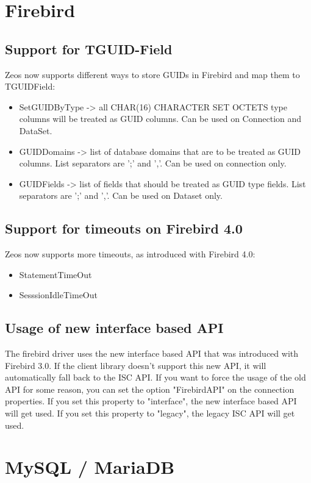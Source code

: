\documentclass[a4paper,12pt,oneside]{article}
\begin{document}
\section{Firebird}

\subsection{Support for TGUID-Field}
Zeos now supports different ways to store GUIDs in Firebird and map them to TGUIDField:
\begin{itemize}
  \item SetGUIDByType -> all CHAR(16) CHARACTER SET OCTETS type columns will be treated as GUID columns. Can be used on Connection and DataSet.
  \item GUIDDomains -> list of database domains that are to be treated as GUID columns. List separators are ';' and ','. Can be used on connection only.
  \item GUIDFields -> list of fields that should be treated as GUID type fields. List separators are ';' and ','. Can be used on Dataset only.
\end{itemize}

\subsection{Support for timeouts on Firebird 4.0}
Zeos now supports more timeouts, as introduced with Firebird 4.0:
\begin{itemize}
  \item StatementTimeOut
  \item SesssionIdleTimeOut
\end{itemize}

\subsection{Usage of new interface based API}
The firebird driver uses the new interface based API that was introduced with Firebird 3.0.
If the client library doesn't support this new API, it will automatically fall back to the ISC API.
If you want to force the usage of the old API for some reason, you can set the option "FirebirdAPI" on the connection properties.
If you set this property to "interface", the new interface based API will get used.
If you set this property to "legacy", the legacy ISC API will get used.

\section{MySQL / MariaDB}
\end{document}

